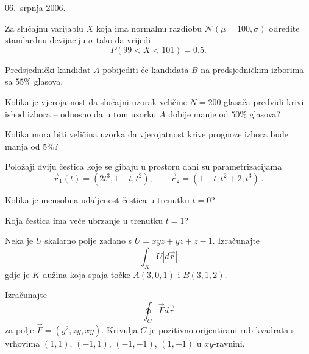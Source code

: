\documentclass{ispit}
\begin{document}
\begin{ispit}{06.~srpnja 2006.}
\begin{zadatak}
Za slu\v{c}ajnu varijablu $X$ koja ima normalnu razdiobu
$\mathcal{N}(\mu =100, \sigma)$ odredite standardnu devijaciju $\sigma$ tako da vrijedi
$$P(99 < X < 101)=0.5 .$$
\end{zadatak}

    \begin{zadatak}
    Predsjedni\v{c}ki kandidat $A$ pobijediti \'ce kandidata $B$ na predsjedni\v{c}kim izborima sa $55\%$ glasova.
\begin{compactenum}[a)]
\item Kolika je vjerojatnost da slu\v{c}ajni uzorak veli\v{c}ine $N=200$ glasa\v{c}a predvidi krivi ishod izbora -- odnosno da u tom uzorku $A$ dobije manje od $50\%$ glasova?
\item Kolika mora biti veli\v{c}ina uzorka da vjerojatnost krive prognoze izbora bude manja od $5\%$?
\end{compactenum}
    \end{zadatak}

\begin{zadatak}
     Polo\v{z}aji dviju \v{c}estica koje se gibaju u prostoru  dani su parametrizacijama
      $$\vec{r}_1(t) = (2t^3, 1-t, t^2), \qquad \vec{r}_2 = (1+t, t^2+2, t^3)\ .$$
\begin{compactenum}[a)]
\item Kolika je me\dj{}usobna udaljenost \v{c}estica u trenutku $t=0$?
\item Koja \v{c}estica ima ve\'ce ubrzanje u trenutku $t=1$?
\end{compactenum}
\end{zadatak}

\begin{zadatak}
  Neka je $U$ skalarno polje zadano s
    $ U = xyz +  yz + z-1$.
  Izra\v cunajte $$\int_{K} U |d\overrightarrow{r}|$$ gdje je $K$
  du\v zina koja spaja to\v cke $A(3,0,1)$ i $B(3,1,2)$.
\end{zadatak}

\begin{zadatak}
Izra\v{c}unajte
$$\oint_C \vec{F} d\vec{r}$$
za polje $\overrightarrow{F}=(y^2, zy, xy)$. Krivulja $C$ je pozitivno orijentirani rub kvadrata s vrhovima $(1,1)$, $(-1,1)$, $(-1,-1)$, $(1,-1)$ u $xy$-ravnini.
\end{zadatak}

\end{ispit}
\end{document}
